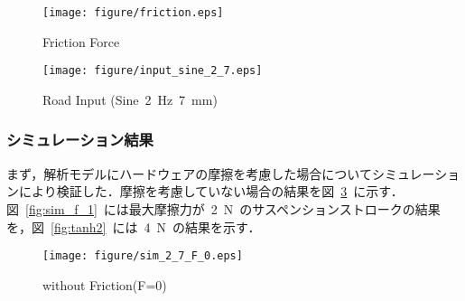 \documentclass[a4paper,12pt]{article_vdlab_sotsuron}
\begin{document}
\vspace{10mm}
\begin{figure}[h]
	\begin{center}
	  \texttt{[image: figure/friction.eps]}
	  \end{center}
    \vspace{2mm}
    \caption{Friction Force}
    \label{fig:force}
\end{figure}


\vspace{15mm}
\begin{figure}[h]
  \centering
   \texttt{[image: figure/input\_sine\_2\_7.eps]}
  \vspace{2mm}
\caption{Road Input (Sine~2~Hz~7~mm)}
  \label{fig:2_7}
\end{figure}


\newpage
\subsubsection{シミュレーション結果}
まず，解析モデルにハードウェアの摩擦を考慮した場合についてシミュレーションにより検証した．摩擦を考慮していない場合の結果を図~\ref{fig:sim_f}~に示す．
図~\ref{fig:sim_f_1}~には最大摩擦力が~2~N~のサスペンションストロークの結果を，図~\ref{fig:tanh2}~には~4~N~の結果を示す．

\vspace{15mm}
\begin{figure}[h]
  \centering
   \texttt{[image: figure/sim\_2\_7\_F\_0.eps]}
  \vspace{2mm}
\caption{without Friction(F=0)}
  \label{fig:sim_f}
\end{figure}
\end{document}

